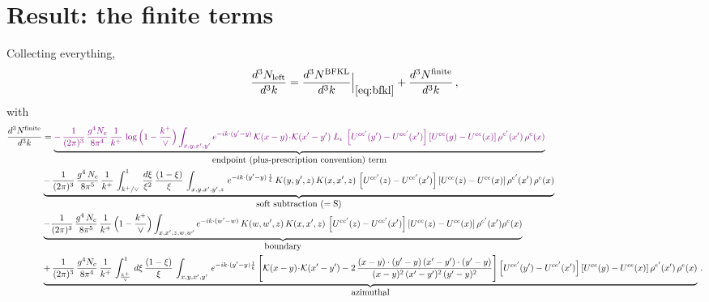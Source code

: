 \documentclass[10pt]{article}
\newcommand{\Leps}{L_{\epsilon}}
\newcommand{\KK}{\mathcal K(x-y)\!\cdot\!\mathcal K(x'-y')}
\newcommand{\Wbr}{\left[U^{ce'}(y') - U^{ce'}(x')\right] \left[U^{ce}(y) - U^{ce}(x)\right] \rho^{e'}(x')\, \rho^{e}(x)}
\begin{document}
\section{Result: the finite terms}
Collecting everything,
\begin{align}
\frac{d^{3}N_{\rm left}}{d^{3}k}
=\frac{d^{3}N^{\rm BFKL}}{d^{3}k}\Big|_{\eqref{eq:bfkl}}
+\frac{d^{3}N^{\rm finite}}{d^{3}k}\,,
\end{align}
with
\begin{align}\label{eq:finite}
    \frac{d^{3}N^{\rm finite}}{d^{3}k}  & =
   \underbrace{{\color{violet}-\,\frac{1}{(2\pi)^{3}}\,\frac{g^{4}N_{c}}{8\pi^{4}}\,\frac{1}{k^{+}}\,\log\Big(1-\frac{k^{+}}{\vee}\Big)\int_{x,y,x',y'}e^{-ik\cdot(y'-y)}\,\KK\;\Leps\;\Wbr}}_{\textstyle \rm endpoint\ (plus\text{-}prescription\ convention)\ term}
    \notag \\ & \underbrace{-\,\frac{1}{(2\pi)^{3}}\,\frac{g^{4}\,N_{c}}{8\pi^{5}}\, \frac{1}{k^{+}}\,\int_{k^{+}/\vee}^{1}\,\frac{d\xi}{\xi^{2}}\,\frac{(1-\xi)}{\xi}\,\int_{x,y,x',y',z}\, e^{-ik\cdot (y'-y)\,\frac{1}{\xi}}\,K(y,y',z)\,K(x,x',z)\,
\left[U^{ce'}(z) - U^{ce'}(x')\right]\left[U^{ce}(z) - U^{ce}(x)\right]\rho^{e'}(x')\,\rho^{e}(x)}_{\textstyle \rm soft\ subtraction\ (=S)} \notag \\ &
    \underbrace{-\frac{1}{(2\pi)^{3}}\,\frac{g^{4}\,N_{c}}{8\pi^{5}}\,\frac{1}{k^{+}}\,\Big(1-\frac{k^{+}}{\vee}\Big)\int_{x,x',z,w,w'}e^{-ik\cdot (w'-w)}\,K(w,w',z)\,K(x,x',z)\,
\left[U^{ce'}(z) - U^{ce'}(x')\right]\left[U^{ce}(z) - U^{ce}(x)\right]\rho^{e'}(x')\rho^{e}(x)}_{\textstyle \rm boundary} \notag \\
&  \underbrace{+\,\frac{1}{(2\pi)^{3}}\,\frac{g^{4}N_{c}}{8\pi^{4}}\, \frac{1}{k^{+}}\,\int_{\frac{k^{+}}{\vee}}^{1}\,d\xi\, \frac{(1-\xi)}{\xi}\, \int_{x,y,x',y'}\,e^{-ik\cdot (y'-y)\frac{1}{\xi}}\,\Bigg[\KK -2\,\frac{(x-y)\cdot (y'-y)\, (x'-y')\cdot (y'-y)}{(x-y)^{2}\,(x'-y')^{2}\,(y'-y)^{2}}\Bigg]\Wbr}_{\textstyle \rm azimuthal}\,.
\end{align}
\end{document}
